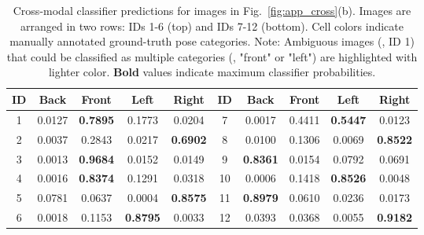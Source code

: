 \begin{table}[t]
    \centering
    \caption{Cross-modal classifier predictions for images in Fig.~\ref{fig:app_cross}(b). Images are arranged in two rows: IDs 1-6 (top) and IDs 7-12 (bottom). Cell colors indicate manually annotated ground-truth pose categories. Note: Ambiguous images (\eg, ID 1) that could be classified as multiple categories (\eg, "front" or "left") are highlighted with lighter color. \textbf{Bold} values indicate maximum classifier probabilities.}
    \label{tab:app_cross}
    \begin{tabular}{ccccc||ccccc} %
        \hline
        \textbf{ID} & \textbf{Back} & \textbf{Front} & \textbf{Left} & \textbf{Right} & \textbf{ID} & \textbf{Back} & \textbf{Front} & \textbf{Left} & \textbf{Right} \\
        \hline
        1  & 0.0127 & \cellcolor{green!10}\textbf{0.7895} & \cellcolor{green!10}0.1773 & 0.0204  & 7  & 0.0017 & \cellcolor{green!10}0.4411 & \cellcolor{green!10}\textbf{0.5447} & 0.0123  \\
        2  & 0.0037 & \cellcolor{green!10}0.2843 & 0.0217 & \cellcolor{green!10}\textbf{0.6902}  & 8  & 0.0100 & 0.1306 & 0.0069 & \cellcolor{green!20}\textbf{0.8522}  \\
        3  & 0.0013 & \cellcolor{green!20}\textbf{0.9684} & 0.0152 & 0.0149  & 9  & \cellcolor{green!20}\textbf{0.8361} & 0.0154 & 0.0792 & 0.0691  \\
        4  & 0.0016 & \cellcolor{green!20}\textbf{0.8374} & 0.1291 & 0.0318  & 10  & 0.0006 & \cellcolor{green!20}0.1418 & \textbf{0.8526} & 0.0048  \\
        5  & 0.0781 & 0.0637 & 0.0004 & \cellcolor{green!20}\textbf{0.8575}  & 11  & \cellcolor{green!20}\textbf{0.8979} & 0.0610 & 0.0236 & 0.0173  \\
        6  & 0.0018 & 0.1153 & \cellcolor{green!20}\textbf{0.8795} & 0.0033  & 12  & 0.0393 & \cellcolor{green!10}0.0368 & 0.0055 & \cellcolor{green!10}\textbf{0.9182}  \\
        \hline
    \end{tabular}
\end{table}

